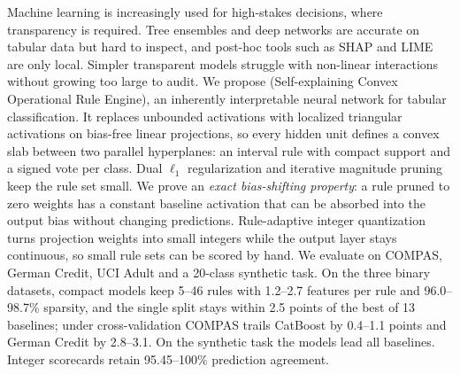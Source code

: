 Machine learning is increasingly used for high-stakes decisions, where
transparency is required. Tree ensembles and deep networks are accurate on tabular
data but hard to inspect, and post-hoc tools such as SHAP and LIME are only
local. Simpler transparent models struggle with non-linear interactions without
growing too large to audit. We propose \modelname{} (Self-explaining Convex Operational Rule Engine), an
inherently interpretable neural network for tabular classification. It replaces
unbounded activations with localized triangular activations on bias-free linear
projections, so every hidden unit defines a convex slab between two parallel
hyperplanes: an interval rule with compact support and a signed vote per class.
Dual $\ell_1$ regularization and iterative magnitude pruning keep the rule set
small. We prove an \emph{exact bias-shifting property}: a rule pruned to zero
weights has a constant baseline activation that can be absorbed into the output
bias without changing predictions. Rule-adaptive integer quantization turns
projection weights into small integers while the output layer stays continuous,
so small rule sets can be scored by hand. We evaluate on COMPAS, German Credit, UCI Adult and a 20-class synthetic task.
On the three binary datasets, compact models keep 5--46 rules with 1.2--2.7
features per rule and 96.0--98.7\% sparsity, and the single split stays within
2.5 points of the best of 13 baselines; under cross-validation COMPAS trails
CatBoost by 0.4--1.1 points and German Credit by 2.8--3.1. On the synthetic task
the models lead all baselines. Integer scorecards retain 95.45--100\% prediction
agreement.
